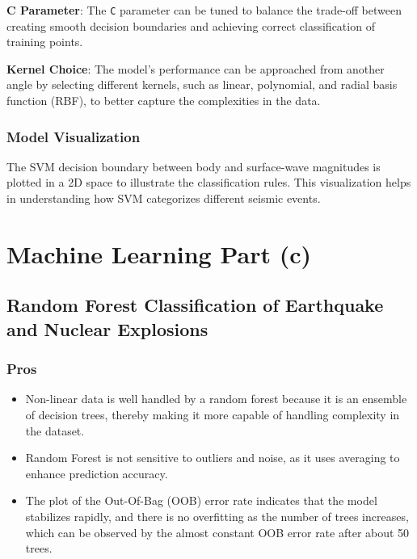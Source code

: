 \documentclass[
]{article}
\providecommand{\tightlist}{%
  \setlength{\itemsep}{0pt}\setlength{\parskip}{0pt}}
\begin{document}
\textbf{C Parameter}: The \texttt{C} parameter can be tuned to balance
the trade-off between creating smooth decision boundaries and achieving
correct classification of training points.

\textbf{Kernel Choice}: The model's performance can be approached from
another angle by selecting different kernels, such as linear,
polynomial, and radial basis function (RBF), to better capture the
complexities in the data.

\subsubsection{Model Visualization}\label{model-visualization}

The SVM decision boundary between body and surface-wave magnitudes is
plotted in a 2D space to illustrate the classification rules. This
visualization helps in understanding how SVM categorizes different
seismic events.

\section{Machine Learning Part (c)}\label{machine-learning-part-c}

\subsection{Random Forest Classification of Earthquake and Nuclear
Explosions}\label{random-forest-classification-of-earthquake-and-nuclear-explosions}

\subsubsection{Pros}\label{pros}

\begin{itemize}
\tightlist
\item
  Non-linear data is well handled by a random forest because it is an
  ensemble of decision trees, thereby making it more capable of handling
  complexity in the dataset.
\item
  Random Forest is not sensitive to outliers and noise, as it uses
  averaging to enhance prediction accuracy.
\item
  The plot of the Out-Of-Bag (OOB) error rate indicates that the model
  stabilizes rapidly, and there is no overfitting as the number of trees
  increases, which can be observed by the almost constant OOB error rate
  after about 50 trees.
\end{itemize}
\end{document}
